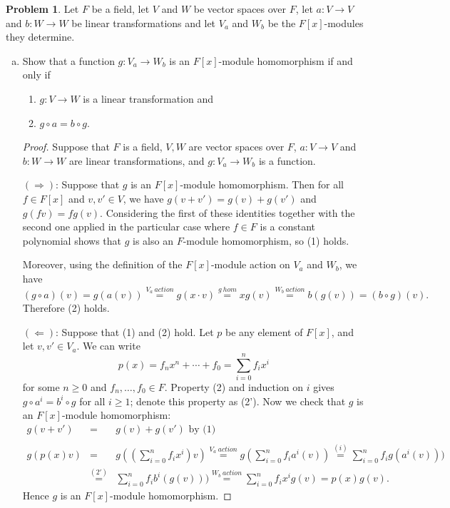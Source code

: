 \documentclass[11pt]{article}
\def\ra{\rightarrow}
\theoremstyle{definition}
\newtheorem{problem}{Problem}
\begin{document}
\begin{problem}
Let $F$ be a field, let $V$ and $W$ be vector spaces over $F$, let $a\!: V \to V$ and $b\!:W \to W$ be linear transformations and let $V_a$ and $W_b$ be the $F[x]$-modules they determine. 
\begin{enumerate}[a)]
\item Show that a function $g: V_a \to W_b$ is an $F[x]$-module homomorphism if and only if 
\begin{enumerate}[(1)]
\item $g: V \to W$ is a linear transformation and 
\item $g \circ a = b \circ g$.
\end{enumerate} 

\begin{proof}
Suppose that $F$ is a field, $V,W$ are vector spaces over $F$, $a\!: V \to V$ and $b\!: W \to W$ are linear transformations, 
and $g: V_a \ra W_b$ is a function.

$(\Rightarrow)$:  
Suppose that $g$ is an $F[x]$-module homomorphism.
Then for all $f \in F[x]$ and $v,v' \in V$, we have
$g(v+v')=g(v)+g(v')$ and $g(fv)=fg(v)$. Considering the first of these identities together with the second one applied in the particular case where $f\in F$ is a constant polynomial shows that  $g$ is also an $F$-module homomorphism, so (1) holds.

Moreover, using the definition of the $F[x]$-module action on $V_a$ and $W_b$, we have
$$(g \circ a)(v) = g(a(v)) \stackrel{V_a~action}{=} 
g(x \cdot v) \stackrel{g~hom}{=} xg(v)
\stackrel{W_b~action}{=} b(g(v)) = (b \circ g)(v).$$
Therefore (2) holds.

$(\Leftarrow)$:  
Suppose that (1) and (2) hold.
Let $p$ be any element of $F[x]$, and let $v,v' \in V_a$. We can write 
$$p(x)=f_nx^n + \cdots + f_0=\sum_{i=0}^n f_ix^i$$
for some $n \geqslant 0$ and $f_n,\ldots,f_0 \in F$.  Property (2) and induction on $i$ gives
$g \circ a^i = b^i \circ g$ for all $i \geqslant 1$; denote this
property as (2'). Now we check that $g$ is an $F[x]$-module homomorphism:
\begin{eqnarray*}
g(v+v') &=& g(v)+g(v') \text{ by (1)} \\ \\
g(p(x)v) &= & g\left(\left(\sum_{i=0}^n f_i x^i\right)v\right)
\stackrel{V_a~action}{=}
 g\left(\sum_{i=0}^n f_i a^i(v)\right) \stackrel{(i)}{=}
\sum_{i=0}^n f_i g(a^i(v)))\\
&\stackrel{(2')}{=}&\sum_{i=0}^n f_i b^i(g(v))) \stackrel{W_b~action}{=}
\sum_{i=0}^n f_ix^ig(v)= p(x)g(v).
\end{eqnarray*}
Hence $g$ is an $F[x]$-module homomorphism.
\end{proof}


\end{enumerate}
\end{problem}
\end{document}

